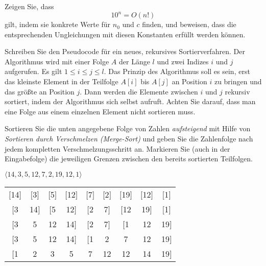 \documentclass[a4paper, 12pt]{article}
\begin{document}


\begin{angabe}
Zeigen Sie, dass
\[
10^n = O(n!)
\]
gilt, indem sie konkrete Werte für $n_0$ und $c$ finden, und beweisen,
dass die entsprechenden Ungleichungen mit diesen Konstanten erfüllt werden
können.
\end{angabe}







\begin{angabe}
Schreiben Sie den Pseudocode f{\"u}r ein neues, rekursives
Sortierverfahren. Der Algorithmus wird mit einer Folge $A$ der Länge
$l$ und zwei Indizes $i$ und $j$ aufgerufen. Es gilt $1\leq i\leq j\leq l$.
Das Prinzip des Algorithmus soll es sein, erst das kleinste Element
in der Teilfolge $A[i]$ bis $A[j]$ an Position $i$ zu bringen und
das größte an Position $j$.  Dann werden die Elemente zwischen $i$
und $j$ rekursiv sortiert, indem der Algorithmus sich selbst
aufruft.  Achten Sie darauf, dass man eine Folge aus einem einzelnen
Element nicht sortieren muss.
\end{angabe}








\begin{angabe}
Sortieren Sie die unten angegebene Folge von Zahlen \emph{aufsteigend} mit
Hilfe von \emph{Sortieren durch Verschmelzen (Merge-Sort)} und geben Sie die
Zahlenfolge nach jedem kompletten Verschmelzungsschritt an. Markieren Sie (auch
in der Eingabefolge) die jeweiligen Grenzen zwischen den bereits sortierten
Teilfolgen.

\begin{center}
$\langle 14, 3, 5, 12, 7, 2, 19, 12, 1 \rangle $
\end{center}


\end{angabe}

\begin{tabular}{ c  c   c  c  c  c  c  c  c }
$[$14$]$ & $[$3$]$ & $[$5$]$ & $[$12$]$ & $[$7$]$ & $[$2$]$ & $[$19$]$ & $[$12$]$ & $[$1$]$ \\
$[$3 & 14$]$ & $[$5 & 12$]$ & $[$2 & 7$]$ & $[$12 & 19$]$ & $[$1$]$ \\
$[$3 & 5 & 12 & 14$]$ & $[$2 & 7$]$ & $[$1 & 12 & 19$]$ \\
$[$3 & 5 & 12 & 14$]$ & $[$1 & 2 & 7 & 12 & 19$]$ \\
$[$1 & 2 & 3 & 5 & 7 & 12 & 12 & 14 & 19$]$ \\
\end{tabular}
\end{document}
